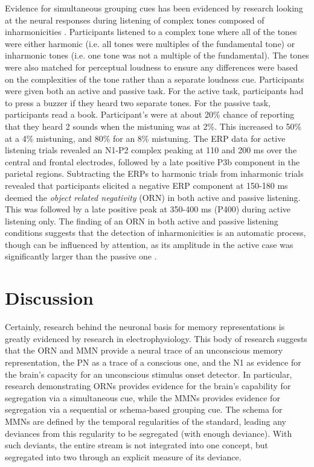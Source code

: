 \documentclass[a4paper,11pt,final]{ThesisStyle}
\begin{document}
Evidence for simultaneous grouping cues has been evidenced by research looking at the neural responses during listening of complex tones composed of inharmonicities \cite{Alain2001,Alain2002}.  Participants listened to a complex tone where all of the tones were either harmonic (i.e. all tones were multiples of the fundamental tone) or inharmonic tones (i.e. one tone was not a multiple of the fundamental).  The tones were also matched for perceptual loudness to ensure any differences were based on the complexities of the tone rather than a separate loudness cue.  Participants were given both an active and passive task.  For the active task, participants had to press a buzzer if they heard two separate tones.  For the passive task, participants read a book.   Participant's were at about 20\% chance of reporting that they heard 2 sounds when the mistuning was at 2\%.  This increased to 50\% at a 4\% mistuning, and 80\% for an 8\% mistuning.  The ERP data for active listening trials revealed an N1-P2 complex peaking at 110 and 200 ms over the central and frontal electrodes, followed by a late positive P3b component in the parietal regions.   Subtracting the ERPs to harmonic trials from inharmonic trials revealed that participants elicited a negative ERP component at 150-180 ms deemed the \textit{object related negativity} (ORN) in both active and passive listening.  This was followed by a late positive peak at 350-400 ms (P400) during active listening only.  The finding of an ORN in both active and passive listening conditions suggests that the detection of inharmonicities is an automatic process, though can be influenced by attention, as its amplitude in the active case was significantly larger than the passive one \cite{Alain2001,Alain2002}.

\section{Discussion}

Certainly, research behind the neuronal basis for memory representations is greatly evidenced by research in electrophysiology.  This body of research suggests that the ORN and MMN provide a neural trace of an unconscious memory representation, the PN as a trace of a conscious one, and the N1 as evidence for the brain's capacity for an unconscious stimulus onset detector.  In particular, research demonstrating ORNs provides evidence for the brain's capability for segregation via a simultaneous cue, while the MMNs provides evidence for segregation via a sequential or schema-based grouping cue.  The schema for MMNs are defined by the temporal regularities of the standard, leading any deviances from this regularity to be segregated (with enough deviance).  With such deviants, the entire stream is not integrated into one concept, but segregated into two through an explicit measure of its deviance.
\end{document}
